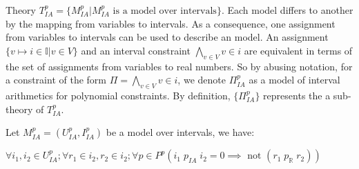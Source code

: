 Theory $T^p_{IA} = \{M^p_{IA}| M^p_{IA} \text{ is a model over intervals}\}$. Each model differs to another by the mapping from variables to intervals. As a consequence, one assignment from variables to intervals can be used to describe an model. An assignment $\{v \mapsto i \in \mathbb{I} | v \in V\}$ and an interval constraint $\bigwedge\limits_{v \in V} v \in i$ are equivalent in terms of the set of assignments from variables to real numbers. So by abusing notation, for a constraint of the form $\Pi = \bigwedge\limits_{v \in V} v \in i$, we denote $\Pi^p_{IA}$ as a model of interval arithmetics for polynomial constraints. By definition, $\{\Pi^p_{IA}\}$ represents the a sub-theory of $T^p_{IA}$.

\begin{lemma} \label{lemma:IA-R-OP}
Let $M^p_{IA} = (U^p_{IA}, I^p_{IA})$ be a model over intervals, we have:
\begin{center}
$\forall i_1, i_2 \in U^p_{IA}; \forall r_1 \in i_2, r_2 \in i_2; \forall p \in P^p (i_1 \; p_{IA} \; i_2 = 0 \implies \text{ not } (r_1 \; p_\mathbb{R} \; r_2))$
\end{center}
\end{lemma}

